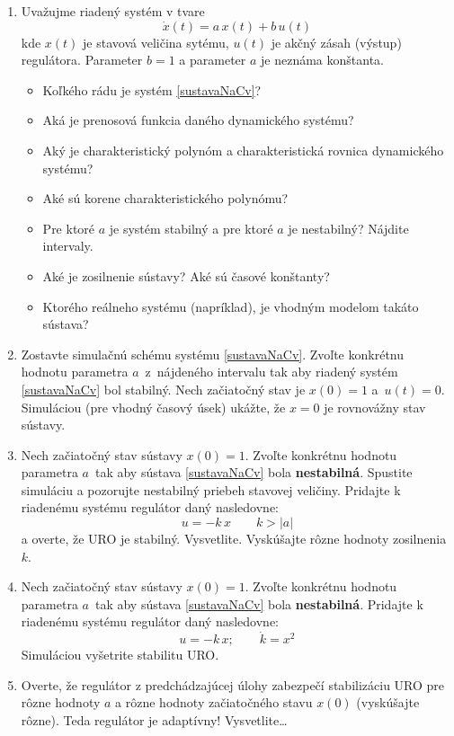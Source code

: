 \documentclass[a4paper, 10pt, ]{article}
\begin{document}
\begin{enumerate}[leftmargin=0pt, labelsep=3mm, itemsep=0pt]

	\item  Uvažujme riadený systém v tvare
	\begin{equation}
		\dot{x}(t) = a\, x(t) + b \, u(t) \label{sustavaNaCv}
	\end{equation}
	kde $x(t)$ je stavová veličina sytému, $u(t)$ je akčný zásah (výstup) regulátora. Parameter $b = 1$ a parameter $a$ je neznáma konštanta.
    \begin{itemize}
		\item Koľkého rádu je systém \eqref{sustavaNaCv}?
		\item Aká je prenosová funkcia daného dynamického systému?
		\item Aký je charakteristický polynóm a charakteristická rovnica dynamického systému?
		\item Aké sú korene charakteristického polynómu?
		\item Pre ktoré $a$ je systém stabilný a pre ktoré $a$ je nestabilný? Nájdite intervaly.
		\item Aké je zosilnenie sústavy? Aké sú časové konštanty?
		\item Ktorého reálneho systému (napríklad), je vhodným modelom takáto sústava?
	\end{itemize}

	\item Zostavte simulačnú schému systému \eqref{sustavaNaCv}. Zvoľte konkrétnu hodnotu parametra $a$~z~nájdeného intervalu tak aby riadený systém \eqref{sustavaNaCv} bol stabilný. Nech začiatočný stav je $x(0) = 1$ a~$u(t)=0$. Simuláciou (pre vhodný časový úsek) ukážte, že $x = 0$ je rovnovážny stav sústavy.

	\item Nech začiatočný stav sústavy $x(0) = 1$. Zvoľte konkrétnu hodnotu parametra $a$~tak aby sústava \eqref{sustavaNaCv} bola \textbf{nestabilná}. Spustite simuláciu a pozorujte nestabilný priebeh stavovej veličiny. Pridajte k riadenému systému regulátor daný nasledovne:
	\begin{equation}
		u = -k\, x \qquad k > \left| a \right|
	\end{equation}
	a overte, že URO je stabilný. Vysvetlite. Vyskúšajte rôzne hodnoty zosilnenia $k$.

	\item Nech začiatočný stav sústavy $x(0) = 1$. Zvoľte konkrétnu hodnotu parametra $a$~tak aby sústava \eqref{sustavaNaCv} bola \textbf{nestabilná}. Pridajte k riadenému systému regulátor daný nasledovne:
	\begin{equation}
		u = -k\, x; \qquad \dot{k} = x^2
	\end{equation}
	Simuláciou vyšetrite stabilitu URO.

	\item Overte, že regulátor z predchádzajúcej úlohy zabezpečí stabilizáciu URO pre rôzne hodnoty $a$ a rôzne hodnoty začiatočného stavu $x(0)$ (vyskúšajte rôzne). Teda regulátor je adaptívny! Vysvetlite\ldots

\end{enumerate}
\end{document}

